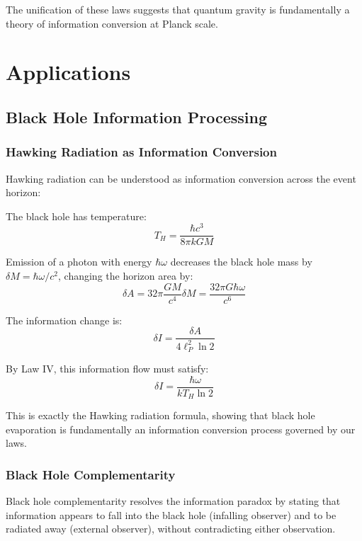 \documentclass[11pt,a4paper]{article}
\theoremstyle{plain}
\theoremstyle{definition}
\theoremstyle{remark}
\begin{document}
The unification of these laws suggests that quantum gravity is fundamentally a theory of information conversion at Planck scale.

\section{Applications}
\label{sec:applications}

\subsection{Black Hole Information Processing}

\subsubsection{Hawking Radiation as Information Conversion}

Hawking radiation can be understood as information conversion across the event horizon:

The black hole has temperature:
\begin{equation}
T_H = \frac{\hbar c^3}{8\pi kGM}
\end{equation}

Emission of a photon with energy $\hbar\omega$ decreases the black hole mass by $\delta M = \hbar\omega/c^2$, changing the horizon area by:
\begin{equation}
\delta A = 32\pi\frac{GM}{c^4}\delta M = \frac{32\pi G\hbar\omega}{c^6}
\end{equation}

The information change is:
\begin{equation}
\delta I = \frac{\delta A}{4\ell_P^2\ln 2}
\end{equation}

By Law IV, this information flow must satisfy:
\begin{equation}
\delta I = \frac{\hbar\omega}{kT_H\ln 2}
\end{equation}

This is exactly the Hawking radiation formula, showing that black hole evaporation is fundamentally an information conversion process governed by our laws.

\subsubsection{Black Hole Complementarity}

Black hole complementarity resolves the information paradox by stating that information appears to fall into the black hole (infalling observer) and to be radiated away (external observer), without contradicting either observation.
\end{document}
